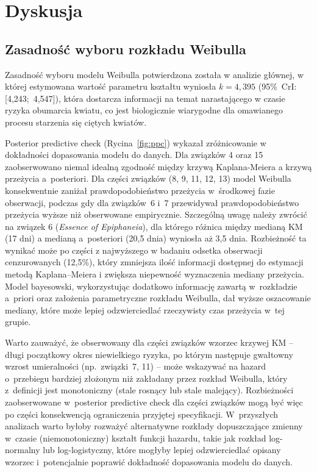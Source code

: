 \documentclass[12pt, a4paper]{article}
\begin{document}
\section{Dyskusja}

\subsection{Zasadność wyboru rozkładu Weibulla}

Zasadność wyboru modelu Weibulla potwierdzona została w analizie głównej, w której estymowana wartość parametru kształtu wyniosła $k = 4{,}395$ (95\%~CrI: [4,243;~4,547]), która dostarcza informacji na temat narastającego w czasie ryzyka obumarcia kwiatu, co jest biologicznie wiarygodne dla omawianego procesu starzenia się ciętych kwiatów.

Posterior predictive check (Rycina~\ref{fig:ppc}) wykazał zróżnicowanie w dokładności dopasowania modelu do danych. Dla związków 4 oraz 15 zaobserwowano niemal idealną zgodność między krzywą Kaplana-Meiera a krzywą przeżycia a~posteriori. Dla części związków (8, 9, 11, 12, 13) model Weibulla konsekwentnie zaniżał prawdopodobieństwo przeżycia w~środkowej fazie obserwacji, podczas gdy dla związków~6 i~7 przewidywał prawdopodobieństwo przeżycia wyższe niż obserwowane empirycznie. Szczególną uwagę należy zwrócić na związek 6 (\textit{Essence of Epiphaneia}), dla którego różnica między medianą KM (17 dni) a medianą a~posteriori (20,5 dnia) wyniosła aż 3,5 dnia. Rozbieżność ta wynikać może po części z najwyższego w badaniu odsetka obserwacji cenzurowanych (12,5\%), który zmniejsza ilość informacji dostępnej do estymacji metodą Kaplana–Meiera i zwiększa niepewność wyznaczenia mediany przeżycia. Model bayesowski, wykorzystując dodatkowo informację zawartą w~rozkładzie a~priori oraz założenia parametryczne rozkładu Weibulla, dał wyższe oszacowanie mediany, które może lepiej odzwierciedlać rzeczywisty czas przeżycia w~tej grupie.

Warto zauważyć, że obserwowany dla części związków wzorzec krzywej KM -- długi początkowy okres niewielkiego ryzyka, po którym następuje gwałtowny wzrost umieralności (np.~związki~7, 11) -- może wskazywać na hazard o~przebiegu bardziej złożonym niż zakładany przez rozkład Weibulla, który z~definicji jest monotoniczny (stale rosnący lub stale malejący). Rozbieżności zaobserwowane w~posterior predictive check dla części związków mogą być więc po części konsekwencją ograniczenia przyjętej specyfikacji. W~przyszłych analizach warto byłoby rozważyć alternatywne rozkłady dopuszczające zmienny w~czasie (niemonotoniczny) kształt funkcji hazardu, takie jak rozkład log-normalny lub log-logistyczny, które mogłyby lepiej odzwierciedlać opisany wzorzec i~potencjalnie poprawić dokładność dopasowania modelu do danych.
\end{document}
